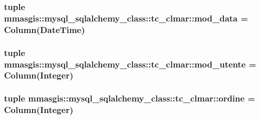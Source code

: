 \label{classmmasgis_1_1mysql__sqlalchemy__class_1_1tc__clmar_adcb91625bb05fcafda1a4a669eda0858}
\hypertarget{classmmasgis_1_1mysql__sqlalchemy__class_1_1tc__clmar_a78dd89c068df38f9b0e0ca0ca412ce87}{
\subsubsection[{mod\_\-data}]{\setlength{\rightskip}{0pt plus 5cm}tuple {\bf mmasgis::mysql\_\-sqlalchemy\_\-class::tc\_\-clmar::mod\_\-data} = Column(DateTime)}}
\label{classmmasgis_1_1mysql__sqlalchemy__class_1_1tc__clmar_a78dd89c068df38f9b0e0ca0ca412ce87}
\hypertarget{classmmasgis_1_1mysql__sqlalchemy__class_1_1tc__clmar_a53b43405b56077bc1dc271273e00a71c}{
\subsubsection[{mod\_\-utente}]{\setlength{\rightskip}{0pt plus 5cm}tuple {\bf mmasgis::mysql\_\-sqlalchemy\_\-class::tc\_\-clmar::mod\_\-utente} = Column(Integer)}}
\label{classmmasgis_1_1mysql__sqlalchemy__class_1_1tc__clmar_a53b43405b56077bc1dc271273e00a71c}
\hypertarget{classmmasgis_1_1mysql__sqlalchemy__class_1_1tc__clmar_ae8d16cca495cf5cc4bad505683b19f7e}{
\subsubsection[{ordine}]{\setlength{\rightskip}{0pt plus 5cm}tuple {\bf mmasgis::mysql\_\-sqlalchemy\_\-class::tc\_\-clmar::ordine} = Column(Integer)}}

